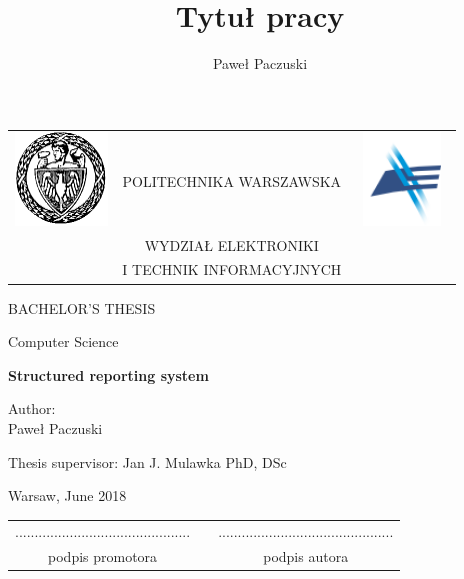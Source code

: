 \documentclass[12pt, twoside, openany]{report}
\author{Paweł Paczuski}
\title{Tytuł pracy}
\theoremstyle{definition}
\begin{document}
\begin{titlepage}
\pagestyle{empty}

\noindent
\begin{Large}
\begin{table}[t]
\centering
\begin{tabular}[t]{lcr}
 \includegraphics[width=70pt,height=70pt]{PW} & POLITECHNIKA WARSZAWSKA & \includegraphics[width=70pt,height=70pt]{ELKA}\\
& WYDZIAŁ ELEKTRONIKI & \\
& I TECHNIK INFORMACYJNYCH &
\end{tabular}
\end{table}

\begin{center}BACHELOR'S THESIS\end{center}
\begin{center}Computer Science\end{center}\end{Large}
\begin{center}
\Huge
\textbf{Structured reporting system}
\end{center}
\vfill
\begin{center}
\Large
Author:\\
\LARGE
Paweł Paczuski
\end{center}
\vfill
\begin{center}
\Large
Thesis supervisor: Jan J. Mulawka PhD, DSc
\end{center}
\vfill
\begin{center}
\Large
Warsaw, June 2018
\end{center}
\newpage
\hfill
\begin{table}[b]
\centering
\begin{tabular}[t]{ccc}
............................................. & \hspace*{100pt} & .............................................\\
podpis promotora & \hspace*{100pt} & podpis autora
\end{tabular}
\end{table}


\end{titlepage}
\end{document}
